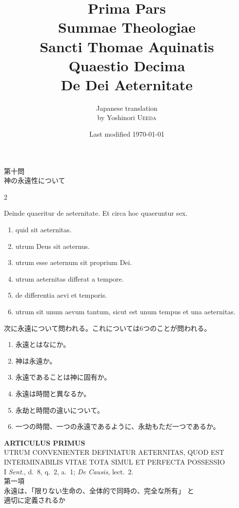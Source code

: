 \documentclass[paper=a4paper,fontsize=10pt,jafontsize=9pt,titlepage]{jlreq}
\title{{\bfseries Prima Pars}\\{\Huge Summae Theologiae}\\Sancti Thomae
Aquinatis\\Quaestio Decima\\{\bfseries De Dei Aeternitate}}
\author{Japanese translation\\by Yoshinori {\scshape Ueeda}}
\date{Last modified \today}
\begin{document}
\maketitle
\begin{center}
{\Large 第十問\\神の永遠性について}
\end{center}


\begin{paracol}{2}

Deinde quaeritur de aeternitate. Et circa hoc quaeruntur sex. 
\begin{enumerate}
 \item quid sit aeternitas.
 \item utrum Deus sit aeternus.
 \item utrum esse aeternum sit proprium Dei. 
 \item utrum aeternitas differat a tempore.
 \item de differentia aevi et temporis. 
 \item utrum sit unum aevum tantum, sicut est unum tempus et una
       aeternitas.
\end{enumerate}

\switchcolumn

次に永遠について問われる。これについては6つのことが問われる。
\begin{enumerate}
 \item 永遠とはなにか。
 \item 神は永遠か。
 \item 永遠であることは神に固有か。
 \item 永遠は時間と異なるか。
 \item 永劫と時間の違いについて。
 \item 一つの時間、一つの永遠であるように、永劫もただ一つであるか。
\end{enumerate}

\end{paracol}

\newpage
{}

\begin{center}
 {\Large {\bfseries ARTICULUS PRIMUS}}\\
 {\large UTRUM CONVENIENTER DEFINIATUR AETERNITAS, QUOD EST
 INTERMINABILIS VITAE TOTA SIMUL ET PERFECTA POSSESSIO}\\
 {\footnotesize I {\itshape Sent.}, d.~8, q.~2, a.~1; {\itshape De
 Causis}, lect.~2.}\\
 {\Large 第一項\\永遠は、「限りない生命の、全体的で同時の、完全な所有」
 と\\適切に定義されるか}
\end{center}
\end{document}
